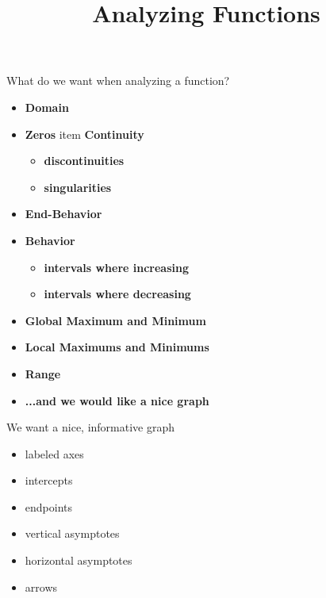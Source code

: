 \documentclass{ximera}
\title{Analyzing Functions}
\begin{document}
\begin{abstract}
%
\end{abstract}
\maketitle






What do we want when analyzing a function?



\begin{itemize}
\item \textbf{\textcolor{red!80!black}{Domain}} 
\item \textbf{\textcolor{red!80!black}{Zeros}} 
item \textbf{\textcolor{red!80!black}{Continuity}} 
	\begin{itemize}
     \item \textbf{\textcolor{purple!85!blue}{discontinuities}} 
     \item \textbf{\textcolor{purple!85!blue}{singularities}} 
	\end{itemize}
\item \textbf{\textcolor{red!80!black}{End-Behavior}} 
\item \textbf{\textcolor{red!80!black}{Behavior}} 
	\begin{itemize}
     \item \textbf{\textcolor{purple!85!blue}{intervals where increasing}} 
     \item \textbf{\textcolor{purple!85!blue}{intervals where decreasing}} 
	\end{itemize}
\item \textbf{\textcolor{red!80!black}{Global Maximum and Minimum}} 
\item \textbf{\textcolor{red!80!black}{Local Maximums and Minimums}} 
\item \textbf{\textcolor{red!80!black}{Range}} 
\item \textbf{\textcolor{blue!55!black}{...and we would like a nice graph}} 
\end{itemize}







We want a nice, informative graph
\begin{itemize}
	\item labeled axes
	\item intercepts
	\item endpoints
	\item vertical asymptotes
	\item horizontal asymptotes
	\item arrows
\end{itemize}
\end{document}

